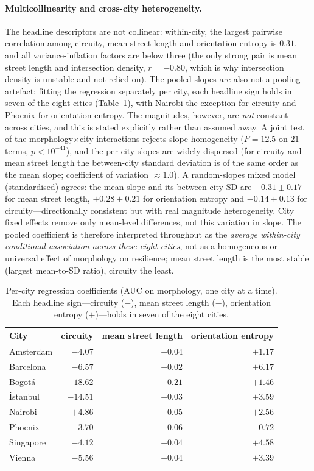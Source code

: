 \documentclass[sn-mathphys-num,pdflatex]{sn-jnl}
\begin{document}
\paragraph{Multicollinearity and cross-city heterogeneity.} The headline descriptors
are not collinear: within-city, the largest pairwise correlation among circuity, mean
street length and orientation entropy is $0.31$, and all variance-inflation factors
are below three (the only strong pair is mean street length and intersection density,
$r=-0.80$, which is why intersection density is unstable and not relied on). The
pooled slopes are also not a pooling artefact: fitting the regression separately per
city, each headline sign holds in seven of the eight cities (Table~\ref{tab:hetero}),
with Nairobi the exception for circuity and Phoenix for orientation entropy.
The magnitudes, however, are \emph{not} constant across cities, and this is stated
explicitly rather than assumed away. A joint test of the morphology$\times$city
interactions rejects slope homogeneity ($F=12.5$ on $21$ terms,
$p<10^{-41}$), and the per-city slopes are widely dispersed (for circuity and mean
street length the between-city standard deviation is of the same order as the mean
slope; coefficient of variation $\approx1.0$). A random-slopes mixed model
(standardised) agrees: the mean slope and its between-city SD are
$-0.31\pm0.17$ for mean street length, $+0.28\pm0.21$ for orientation entropy and
$-0.14\pm0.13$ for circuity---directionally consistent but with real magnitude
heterogeneity. City fixed effects remove only mean-level differences, not this
variation in slope. The pooled coefficient is therefore interpreted throughout as the
\emph{average within-city conditional association across these eight cities}, not as a
homogeneous or universal effect of morphology on resilience; mean street length is the
most stable (largest mean-to-SD ratio), circuity the least.

\begin{table}[t]\centering
\caption{Per-city regression coefficients (AUC on morphology, one city at a time).
Each headline sign---circuity ($-$), mean street length ($-$), orientation entropy
($+$)---holds in seven of the eight cities.}
\label{tab:hetero}
\begin{tabular}{lrrr}
\toprule
City & circuity & mean street length & orientation entropy\\
\midrule
Amsterdam & $-4.07$ & $-0.04$ & $+1.17$\\
Barcelona & $-6.57$ & $+0.02$ & $+6.17$\\
Bogotá    & $-18.62$ & $-0.21$ & $+1.46$\\
İstanbul  & $-14.51$ & $-0.03$ & $+3.59$\\
Nairobi   & $+4.86$ & $-0.05$ & $+2.56$\\
Phoenix   & $-3.70$ & $-0.06$ & $-0.72$\\
Singapore & $-4.12$ & $-0.04$ & $+4.58$\\
Vienna    & $-5.56$ & $-0.04$ & $+3.39$\\
\bottomrule
\end{tabular}
\end{table}
\end{document}
